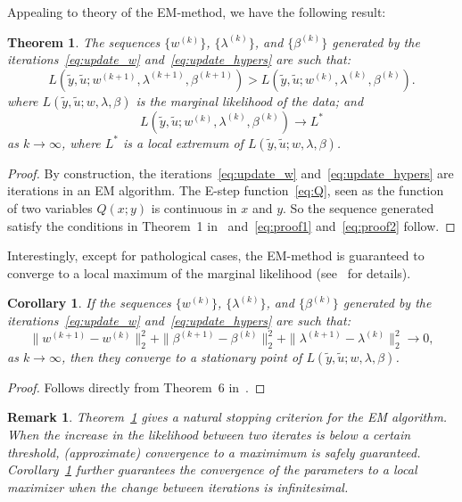 \documentclass[10pt]{article}
\newtheorem{corollary}{Corollary}
\newtheorem{remark}{Remark}
\newtheorem{theorem}{Theorem}
\begin{document}
Appealing to theory of the EM-method, we have the following result:
\begin{theorem}\label{thm:1}
  The sequences $\{w^{(k)}\}$, $\{\lambda^{(k)}\}$, and $\{\beta^{(k)}\}$
  generated by the iterations~\eqref{eq:update_w} and~\eqref{eq:update_hypers}
  are such that:
  \begin{equation}\label{eq:proof1}
    L(\tilde y,\tilde u;w^{(k+1)},\lambda^{(k+1)},\beta^{(k+1)}) >
    L(\tilde y,\tilde u;w^{(k)},\lambda^{(k)},\beta^{(k)}).
  \end{equation}
  where $L(\tilde y,\tilde u;w,\lambda,\beta)$ is the marginal likelihood of
  the data; and
  \begin{equation} \label{eq:proof2}
    L(\tilde y,\tilde u;w^{(k)},\lambda^{(k)},\beta^{(k)}) \to
    L^*
  \end{equation}
  as $k\to \infty$,  where $L^*$ is a local extremum of $L(\tilde y
  ,\tilde u; w,\lambda,\beta)$.
\end{theorem}
\begin{proof}
  By construction, the iterations~\eqref{eq:update_w} and~\eqref{eq:update_hypers} are iterations in an EM algorithm. The E-step function~\eqref{eq:Q}, seen as the function of two variables $Q(x;y)$ is continuous in
  $x$ and $y$. So the sequence generated satisfy the conditions in Theorem~1 in~\cite{wu1983convergence} and~\eqref{eq:proof1} and~\eqref{eq:proof2} follow.
\end{proof}
Interestingly, except for pathological cases, the EM-method is guaranteed to
converge to a local maximum of the marginal likelihood (see~\cite[Ch. 3]{mclachlan2007algorithm} for details).
\begin{corollary}\label{cor:1}
  If the sequences $\{w^{(k)}\}$, $\{\lambda^{(k)}\}$, and
  $\{\beta^{(k)}\}$
  generated by the iterations~\eqref{eq:update_w} and~\eqref{eq:update_hypers}
  are such that:
  \begin{equation*}\|w^{(k+1)} - w^{(k)}\|^2_2+\|\beta^{(k+1)} - \beta^{(k)}\|^2_2 +
    \|\lambda^{(k+1)} - \lambda^{(k)}\|^2_2 \to 0,
  \end{equation*}
  as $k\to \infty$, then they converge to a stationary point of $L(\tilde y,
  \tilde u; w ,\lambda,\beta)$.
\end{corollary}
\begin{proof}
  Follows directly from Theorem~6 in~\cite{wu1983convergence}.
\end{proof}
\begin{remark}
  Theorem~\ref{thm:1} gives a natural stopping criterion for the EM algorithm.
  When the increase in the likelihood between two iterates is below a certain
  threshold, (approximate) convergence to a maximimum is safely guaranteed.
  Corollary~\ref{cor:1} further guarantees the convergence of the parameters to
  a local maximizer when the change between iterations is infinitesimal.
\end{remark}
\end{document}

